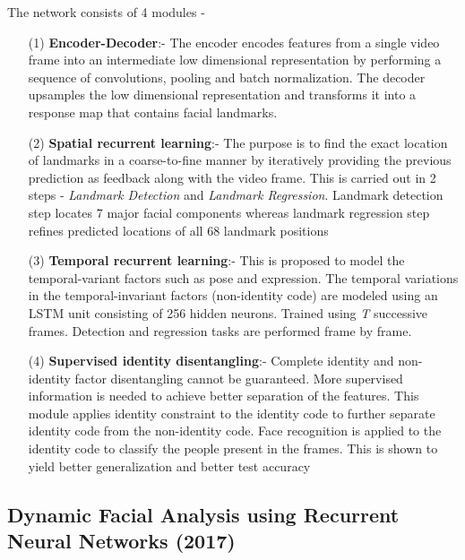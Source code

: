 \documentclass{llncs}
\begin{document}
The network consists of 4 modules -
\begin{itemize}
\item[(1)] \textbf{Encoder-Decoder}:-
The encoder encodes features from a single video frame into an intermediate low dimensional representation by performing a sequence of convolutions, pooling and batch normalization. The decoder upsamples the low dimensional representation and transforms it into a response map that contains facial landmarks.


\item[(2)] \textbf{Spatial recurrent learning}:-
The purpose is to find the exact location of landmarks in a coarse-to-fine manner by iteratively providing the previous prediction as feedback along with the video frame. This is carried out in 2 steps - \textit{Landmark Detection} and \textit{Landmark Regression}. Landmark detection step locates 7 major facial components whereas landmark regression step refines predicted locations of all 68 landmark positions

\item[(3)] \textbf{Temporal recurrent learning}:-
This is proposed to model the temporal-variant factors such as pose and expression. The temporal variations in the temporal-invariant factors (non-identity code) are modeled using an LSTM unit consisting of 256 hidden neurons.
Trained using \textit{T} successive frames. Detection and regression tasks are performed frame by frame. 


\item[(4)] \textbf{Supervised identity disentangling}:-
Complete identity and non-identity factor disentangling cannot be guaranteed. More supervised information is needed to achieve better separation of the features. This module applies identity constraint to the identity code to further separate identity code from the non-identity code. Face recognition is applied to the identity code to classify the people present in the frames. This is shown to yield better generalization and better test accuracy\\
\end{itemize}
 

\subsection{Dynamic Facial Analysis using Recurrent Neural Networks (2017) \cite{dynamic_facial_analysis}}
\end{document}
